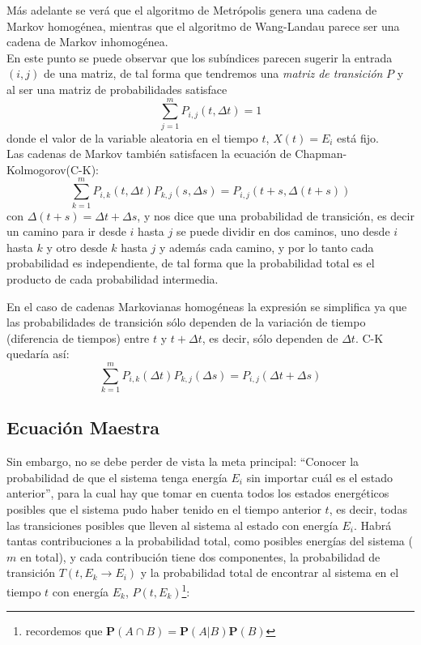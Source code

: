 \documentclass[12pt]{book}
\begin{document}
Más adelante se verá que el algoritmo de Metrópolis genera una cadena de Markov homogénea, mientras que el algoritmo de Wang-Landau parece ser una cadena de Markov inhomogénea.
\\



En este punto se puede observar que los subíndices parecen sugerir la entrada $(i,j)$ de una matriz, de tal forma que tendremos una \textit{matriz de transición} $P$ y al ser una matriz de probabilidades satisface
\begin{equation}
\sum_{j=1}^{m} P_{i,j}(t,\Delta t)=1
\end{equation}
donde el valor de la variable aleatoria en el tiempo $t$, $X(t)=E_{i}$ está fijo.
\\


Las cadenas de Markov también satisfacen la ecuación de Chapman-Kolmogorov(C-K):
\begin{equation}
\sum_{k=1}^{m} P_{i,k}(t, \Delta t)P_{k,j}(s,\Delta s)=P_{i,j}(t+s,\Delta (t+s))
 \end{equation}
 con $\Delta (t+s)=\Delta t +  \Delta s$, y nos dice que una probabilidad de transición, es decir un camino para ir desde $i$ hasta $j$ se puede dividir en dos caminos, uno desde $i$ hasta $k$ y otro desde $k$ hasta $j$ y además cada camino, y por lo tanto cada probabilidad es independiente, de tal forma que la probabilidad total es el producto de cada probabilidad intermedia.
 
 En el caso de cadenas Markovianas homogéneas la expresión se simplifica ya que las probabilidades de transición sólo dependen de la variación de tiempo (diferencia de tiempos) entre $t$ y $t+\Delta t$, es decir, sólo dependen de $\Delta t$. C-K quedaría así:
 \begin{equation}
\sum_{k=1}^{m} P_{i,k}(\Delta t)P_{k,j}(\Delta s)=P_{i,j}(\Delta t + \Delta s)
 \end{equation}

\subsection{Ecuación Maestra}

Sin embargo, no se debe perder de vista la meta principal: ``Conocer  la probabilidad  de que el sistema tenga energía $E_{i}$ sin importar cuál es el estado anterior'', para la cual hay que tomar en cuenta todos los estados energéticos posibles que el sistema pudo haber tenido en el tiempo anterior $t$, es decir, todas las transiciones posibles que lleven al sistema al estado con energía $E_{i}$. Habrá tantas contribuciones a la probabilidad total, como posibles energías del sistema ($m$ en total), y cada contribución tiene dos componentes, la probabilidad de transición $T(t, E_{k}\rightarrow E_{i})$ y la probabilidad total de encontrar al sistema en el tiempo  $t$ con energía $E_{k}$, $P(t,E_{k})$\footnote{recordemos que $\textbf{P}(A \cap B)=\textbf{P}(A|B)\textbf{P}(B)$}:
\end{document}
